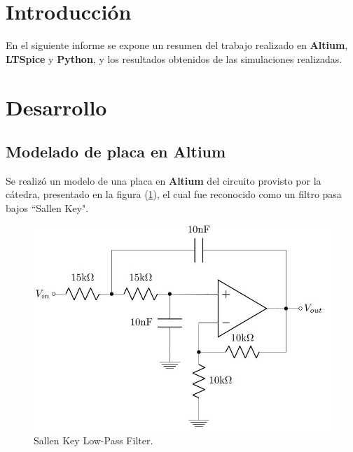 \documentclass[a4paper]{article}
\begin{document}




\section*{Introducción}

En el siguiente informe se expone un resumen del trabajo realizado en \textbf{Altium}, \textbf{LTSpice} y \textbf{Python}, y los resultados obtenidos de las simulaciones realizadas.

\section*{Desarrollo}

\subsection*{Modelado de placa en Altium}
Se realizó un modelo de una placa en \textbf{Altium} del circuito provisto por la cátedra, presentado en la figura (\ref{fig:AltiumCirc}), el cual fue reconocido como un filtro pasa bajos ``Sallen Key".


\begin{figure}[H]
	\centering
	\includegraphics[width=\textwidth]{Altium-Circuito}
	\caption{Sallen Key Low-Pass Filter.}
	\label{fig:AltiumCirc}
\end{figure}
\end{document}
